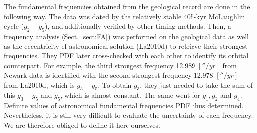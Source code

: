 \documentclass[12pt]{article}
\begin{document}
	The fundamental frequencies obtained from the geological record \citep{olsen2019} are done in the following way. The data was dated by the relatively stable 405-kyr McLaughlin cycle ($g_2 - g_5$), and additionally verified by other timing methods. Then, a frequency analysis (Sect. \ref{sect:FA}) was performed on the geological data as well as the eccentricity of astronomical solution (La2010d) to retrieve their strongest frequencies. They PDF later cross-checked with each other to identify its orbital counterpart. For example, the third strongest frequency 12.989 $[''/ yr]$ from Newark data is identified with the second strongest frequency 12.978 $[''/ yr]$ from La2010d, which is $g_3- g_5$. To obtain $g_3$, they just needed to take the sum of this $g_3- g_5$ and $g_5$, which is almost constant. The same went for $g_1, g_2$ and $g_4$. Definite values of astronomical fundamental frequencies PDF thus determined. Nevertheless, it is still very difficult to evaluate the uncertainty of each frequency. We are therefore obliged to define it here ourselves. 
\end{document}
